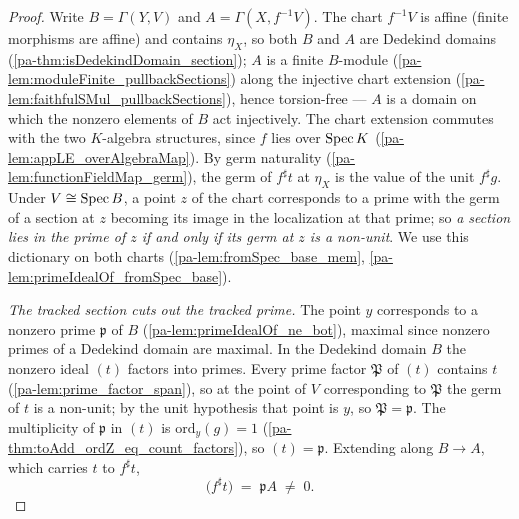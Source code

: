 \begin{proof}
  \leanok
  Write \(B = \Gamma(Y, V)\) and \(A = \Gamma(X, f^{-1}V)\). The chart \(f^{-1}V\) is
  affine (finite morphisms are affine) and contains \(\eta_X\), so both \(B\) and \(A\)
  are Dedekind domains (\ref{pa-thm:isDedekindDomain_section}); \(A\) is a finite
  \(B\)-module (\ref{pa-lem:moduleFinite_pullbackSections}) along the injective chart
  extension (\ref{pa-lem:faithfulSMul_pullbackSections}), hence torsion-free --- \(A\) is
  a domain on which the nonzero elements of \(B\) act injectively. The chart extension
  commutes with the two \(K\)-algebra structures, since \(f\) lies over \(\operatorname{Spec} K\)
  (\ref{pa-lem:appLE_overAlgebraMap}). By germ naturality
  (\ref{pa-lem:functionFieldMap_germ}), the germ of \(f^{\sharp}t\) at \(\eta_X\) is the
  value of the unit \(f^{\sharp}g\). Under \(V \cong \operatorname{Spec} B\), a point \(z\) of the
  chart corresponds to a prime with the germ of a section at \(z\) becoming its image
  in the localization at that prime; so \emph{a section lies in the prime of \(z\) if
  and only if its germ at \(z\) is a non-unit}. We use this dictionary on both charts
  (\ref{pa-lem:fromSpec_base_mem}, \ref{pa-lem:primeIdealOf_fromSpec_base}).

  \emph{The tracked section cuts out the tracked prime.} The point \(y\) corresponds
  to a nonzero prime \(\mathfrak p\) of \(B\) (\ref{pa-lem:primeIdealOf_ne_bot}), maximal
  since nonzero primes of a Dedekind domain are maximal. In the Dedekind domain \(B\)
  the nonzero ideal \((t)\) factors into primes. Every prime factor \(\mathfrak P\) of
  \((t)\) contains \(t\) (\ref{pa-lem:prime_factor_span}), so at the point of \(V\)
  corresponding to \(\mathfrak P\) the germ of \(t\) is a non-unit; by the unit
  hypothesis that point is \(y\), so \(\mathfrak P = \mathfrak p\). The multiplicity
  of \(\mathfrak p\) in \((t)\) is \(\mathrm{ord}_y(g) = 1\)
  (\ref{pa-thm:toAdd_ordZ_eq_count_factors}), so \((t) = \mathfrak p\). Extending along
  \(B \to A\), which carries \(t\) to \(f^{\sharp}t\),
  \[
    \bigl(f^{\sharp}t\bigr) \;=\; \mathfrak p A \;\neq\; 0 .
  \]


\end{proof}
